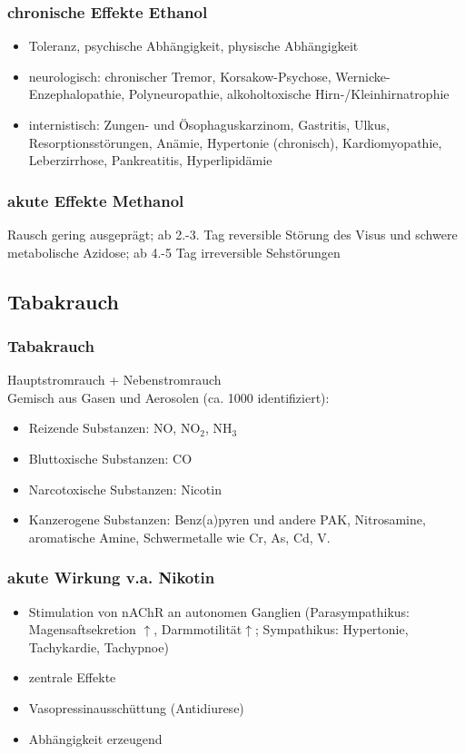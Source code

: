 \documentclass[10pt,a4paper]{report}
\begin{document}
\subsubsection{chronische Effekte Ethanol} %
\label{ssub:chronische_effekte_ethanol}
\begin{itemize}
	\item Toleranz, psychische Abhängigkeit, physische Abhängigkeit
	\item neurologisch: chronischer Tremor, Korsakow-Psychose, Wernicke-Enzephalopathie, Polyneuropathie, alkoholtoxische Hirn-/Kleinhirnatrophie
	\item internistisch: Zungen- und Ösophaguskarzinom, Gastritis, Ulkus, Resorptionsstörungen, Anämie, Hypertonie (chronisch), Kardiomyopathie, Leberzirrhose, Pankreatitis, Hyperlipidämie
\end{itemize}
\subsubsection{akute Effekte Methanol} %
\label{ssub:akute_effekte_methanol}
Rausch gering ausgeprägt; ab 2.-3. Tag reversible Störung des Visus und schwere metabolische Azidose; ab 4.-5 Tag irreversible Sehstörungen
\subsection{Tabakrauch} %
\label{sub:tabakrauch}
\subsubsection{Tabakrauch} %
\label{ssub:subsubsection_name}
Hauptstromrauch + Nebenstromrauch\\ Gemisch aus Gasen und Aerosolen (ca. 1000 identifiziert): 
\begin{itemize}
	\item Reizende Substanzen: NO, NO$_2$, NH$_3$ 
	\item Bluttoxische Substanzen: CO 
	\item Narcotoxische Substanzen: Nicotin 
	\item Kanzerogene Substanzen: Benz(a)pyren und andere PAK, Nitrosamine, aromatische Amine, Schwermetalle wie Cr, As, Cd, V. 
\end{itemize}
\subsubsection{akute Wirkung v.a. Nikotin} %
\label{ssub:akute_wirkung_v_a_nikotin}
\begin{itemize}
	\item Stimulation von nAChR an autonomen Ganglien (Parasympathikus: Magensaftsekretion $\uparrow$, Darmmotilität$\uparrow$; Sympathikus: Hypertonie, Tachykardie, Tachypnoe)
	\item zentrale Effekte
	\item Vasopressinausschüttung (Antidiurese)
	\item Abhängigkeit erzeugend
\end{itemize}
\end{document}
